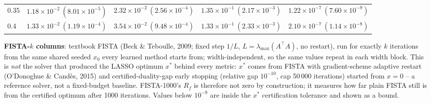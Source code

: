 \begin{table}[htbp]
\begin{tabular}{@{} l rrrr @{}}
0.35 & $1.18\!\times\!10^{-2}\ (8.01\!\times\!10^{-5})$ & $2.32\!\times\!10^{-2}\ (2.56\!\times\!10^{-4})$ & $1.35\!\times\!10^{-1}\ (2.17\!\times\!10^{-3})$ & $1.22\!\times\!10^{-7}\ (7.60\!\times\!10^{-9})$ \\
0.4 & $1.33\!\times\!10^{-2}\ (1.19\!\times\!10^{-4})$ & $3.54\!\times\!10^{-2}\ (9.48\!\times\!10^{-4})$ & $1.33\!\times\!10^{-1}\ (2.33\!\times\!10^{-3})$ & $2.10\!\times\!10^{-7}\ (1.14\!\times\!10^{-8})$ \\
\bottomrule
\end{tabular}
\vspace{2pt}
\begin{minipage}{\linewidth}\footnotesize
\textbf{FISTA-$k$ columns}: textbook FISTA (Beck \& Teboulle, 2009; fixed step $1/L$, $L = \lambda_{\max}(A^\top A)$, no restart), run for exactly $k$ iterations from the same shared seeded $x_0$ every learned method starts from; width-independent, so the same values repeat in each width block. This is \emph{not} the solver that produced the LASSO optimum $x^*$ behind every metric: $x^*$ comes from FISTA with gradient-scheme adaptive restart (O'Donoghue \& Cand\`es, 2015) and certified-duality-gap early stopping (relative gap $10^{-10}$, cap 50\,000 iterations) started from $x = 0$ -- a reference solver, not a fixed-budget baseline. FISTA-1000's $R_f$ is therefore not zero by construction; it measures how far plain FISTA still is from the certified optimum after 1000 iterations. Values below $10^{-9}$ are inside the $x^*$ certification tolerance and shown as a bound.
\end{minipage}
\end{table}


